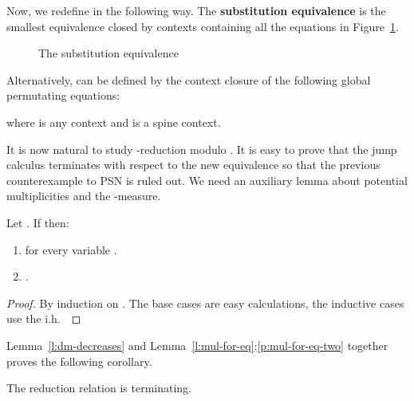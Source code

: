 \documentclass{LMCS}
\renewcommand{\>}{\rightarrow}
\newcommand{\ih}{i.h.}
\newcommand{\deft}[1]{{\bf #1}}
\newcommand{\ignore}[1]{}
\begin{document}
\noindent Now, we redefine  in the following way. The \deft{substitution
  equivalence}  is the smallest equivalence closed by contexts
containing all the equations in Figure~\ref{f:eqf}. 

\begin{figure}[ht]

\caption{The substitution equivalence }
\label{f:eqf}
\end{figure}

\noindent Alternatively,
   can be defined by the context closure of the following
  global permutating equations:

where  is any context and  is a spine context.\medskip

It is now natural to study -reduction
modulo .  It is easy to prove that the
jump calculus terminates with respect to the
new equivalence  so that the previous counterexample to PSN is
ruled out. We need an auxiliary lemma about potential multiplicities and the -measure. 

\begin{lem}
\label{l:mul-for-eq}
Let . If   then:
\begin{enumerate}[\rm(1)]
\item  for every variable .
\item \label{p:mul-for-eq-two} .
\end{enumerate}
\end{lem}

\begin{proof}
By induction on . The base cases are easy calculations, the
inductive cases use the \ih\ 
\ignore{We show the base case, the
  inductive ones follow from the \ih:
\begin{itemize}   
\item , with  and . We get:



\item , where  and . First, let us show that
  . If
   then both expression are equal to
  , as , otherwise are both
  equal to . Then:


\end{itemize}}
\end{proof}


Lemma~\ref{l:dm-decreases} and
Lemma~\ref{l:mul-for-eq}:\ref{p:mul-for-eq-two} together proves the
following corollary.

\begin{cor}
\label{l:dis-f}
The reduction relation  is terminating.
\end{cor}
\end{document}
